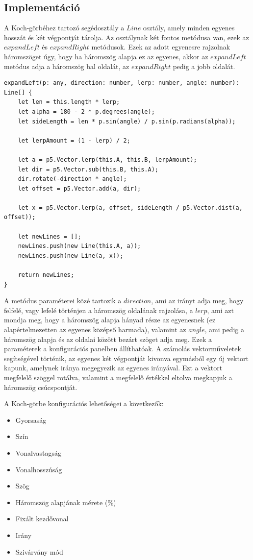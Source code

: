 \subsection*{Implementáció}
A Koch-görbéhez tartozó segédosztály a $Line$ osztály, amely minden egyenes hosszát és két végpontját tárolja. Az osztálynak két fontos metódusa van, ezek az $expandLeft$ és $expandRight$ metódusok. Ezek az adott egyenesre rajzolnak háromszöget úgy, hogy ha háromszög alapja ez az egyenes, akkor az $expandLeft$ metódus adja a háromszög bal oldalát, az $expandRight$ pedig a jobb oldalát.
\clearpage
\begin{lstlisting}
expandLeft(p: any, direction: number, lerp: number, angle: number): Line[] {
	let len = this.length * lerp;
	let alpha = 180 - 2 * p.degrees(angle);
	let sideLength = len * p.sin(angle) / p.sin(p.radians(alpha));
	
	let lerpAmount = (1 - lerp) / 2;
	
	let a = p5.Vector.lerp(this.A, this.B, lerpAmount);
	let dir = p5.Vector.sub(this.B, this.A);
	dir.rotate(-direction * angle);
	let offset = p5.Vector.add(a, dir);
	
	let x = p5.Vector.lerp(a, offset, sideLength / p5.Vector.dist(a, offset));
	
	let newLines = [];
	newLines.push(new Line(this.A, a));
	newLines.push(new Line(a, x));
	
	return newLines;
}
\end{lstlisting}
A metódus paraméterei közé tartozik a $direction$, ami az irányt adja meg, hogy felfelé, vagy lefelé történjen a háromszög oldalának rajzolása, a $lerp$, ami azt mondja meg, hogy a háromszög alapja hányad része az egyenesnek (ez alapértelmezetten az egyenes középső harmada), valamint az $angle$, ami pedig a háromszög alapja és az oldalai között bezárt szöget adja meg. Ezek a paraméterek a konfigurációs panelben állíthatóak. A számolás vektorműveletek segítségével történik, az egyenes két végpontját kivonva egymásból egy új vektort kapunk, amelynek iránya megegyezik az egyenes irányával. Ezt a vektort megfelelő szöggel rotálva, valamint a megfelelő értékkel eltolva megkapjuk a háromszög csúcspontját.
\par A Koch-görbe konfigurációs lehetőségei a következők:
\begin{itemize}
	\item Gyorsaság
	\item Szín
	\item Vonalvastagság
	\item Vonalhosszúság
	\item Szög
	\item Háromszög alapjának mérete (\%)
	\item Fixált kezdővonal
	\item Irány
	\item Szivárvány mód
\end{itemize}
